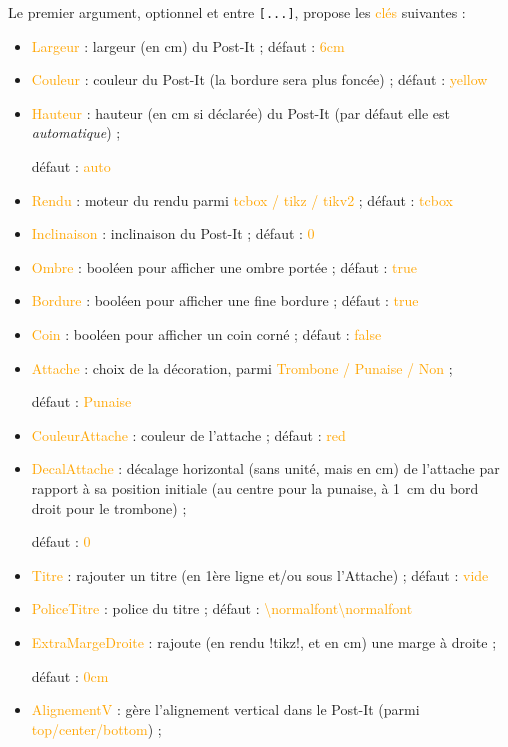 \documentclass[french,a4paper,11pt]{article}
\newcommand\Cle[1]{{\small\sffamily\textlangle \textcolor{orange}{#1}\textrangle}}
\newcommand\cmaj[1]{\tcbox[vignetteMaJ]{#1}\xspace}
\begin{document}
\begin{tipblock}
Le premier argument, optionnel et entre \texttt{[...]}, propose les \Cle{clés} suivantes :

\begin{itemize}
	\item \Cle{Largeur} : largeur (en cm) du Post-It  ; \hfill{}défaut : \Cle{6cm}
	\item \Cle{Couleur} : couleur du Post-It (la bordure sera plus foncée) ; \hfill{}défaut : \Cle{yellow}
	\item \Cle{Hauteur} : hauteur (en cm si déclarée) du Post-It (par défaut elle est \textit{automatique}) ;
	
	\hfill{}défaut : \Cle{auto}
	\item \cmaj{0.1.1} \Cle{Rendu} : moteur du rendu parmi \Cle{tcbox / tikz / tikv2} ; \hfill{}défaut : \Cle{tcbox}
	\item \Cle{Inclinaison} : inclinaison du Post-It ; \hfill{}défaut : \Cle{0}
	\item \Cle{Ombre} : booléen pour afficher une ombre portée ; \hfill{}défaut : \Cle{true}
	\item \Cle{Bordure} : booléen pour afficher une fine bordure ; \hfill{}défaut : \Cle{true}
	\item \Cle{Coin} : booléen pour afficher un coin corné ; \hfill{}défaut : \Cle{false}
	\item \Cle{Attache} : choix de la décoration, parmi \Cle{Trombone / Punaise / Non} ;
	
	\hfill{}défaut : \Cle{Punaise}
	\item \Cle{CouleurAttache} : couleur de l'attache ; \hfill{}défaut : \Cle{red}
	\item \Cle{DecalAttache} : décalage horizontal (sans unité, mais en cm) de l'attache par rapport à sa position initiale (au centre pour la punaise, à 1~cm du bord droit pour le trombone) ;
	
	\hfill{}défaut : \Cle{0}
	\item \cmaj{0.1.1} \Cle{Titre} : rajouter un titre (en 1ère ligne et/ou sous l'Attache) ; \hfill{}défaut : \Cle{vide}
	\item \cmaj{0.1.1} \Cle{PoliceTitre} : police du titre ; \hfill{}défaut : \Cle{\textbackslash normalfont\textbackslash normalfont}
	\item \cmaj{0.1.1} \Cle{ExtraMargeDroite} : rajoute (en rendu \packagetex!tikz!, et en cm) une marge à droite ;
	
	\hfill{}défaut : \Cle{0cm}
	\item \Cle{AlignementV} : gère l'alignement vertical dans le Post-It (parmi \Cle{top/center/bottom}) ;
	

\end{itemize}
\end{tipblock}
\end{document}
